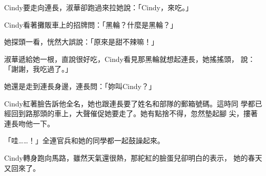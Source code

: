 Cindy要走向連長，淑華卻跑過來拉她說：「Cindy，來吃。」

Cindy看著攤販車上的招牌問：「黑輪？什麼是黑輪？」

她探頭一看，恍然大誤說：「原來是甜不辣嘛！」

淑華遞給她一根，直說很好吃，Cindy看見那黑輪就想起連長，她搖搖頭，
說：「謝謝，我吃過了。」

她還是走到連長身邊，連長問：「妳叫Cindy？」

Cindy紅著臉告訴他全名，她也跟連長要了姓名和部隊的郵箱號碼。這時同
學都已經回到路那頭的車上，大聲催促她要走了。她有點捨不得，忽然墊起腳
尖，摟著連長吻他一下。

「哇……！」全連官兵和她的同學都一起鼓譟起來。

Cindy轉身跑向馬路，雖然天氣還很熱，那紽紅的臉蛋兒卻明白的表示，
她的春天又回來了。











